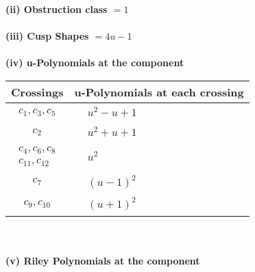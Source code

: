 \documentclass[1p]{elsarticle_modified}
\theoremstyle{definition}
\begin{document}
\flushleft \textbf{(ii) Obstruction class $= 1$}\\~\\
\flushleft \textbf{(iii) Cusp Shapes $= 4 u-1$}\\~\\
\newpage\renewcommand{\arraystretch}{1}
\flushleft \textbf{(iv) u-Polynomials at the component}\newline \\
\begin{tabular}{m{50pt}|m{274pt}}
Crossings & \hspace{64pt}u-Polynomials at each crossing \\
\hline $$\begin{aligned}c_{1},c_{3},c_{5}\end{aligned}$$&$\begin{aligned}
&u^2- u+1
\end{aligned}$\\
\hline $$\begin{aligned}c_{2}\end{aligned}$$&$\begin{aligned}
&u^2+u+1
\end{aligned}$\\
\hline $$\begin{aligned}c_{4},c_{6},c_{8}\\c_{11},c_{12}\end{aligned}$$&$\begin{aligned}
&u^2
\end{aligned}$\\
\hline $$\begin{aligned}c_{7}\end{aligned}$$&$\begin{aligned}
&(u-1)^2
\end{aligned}$\\
\hline $$\begin{aligned}c_{9},c_{10}\end{aligned}$$&$\begin{aligned}
&(u+1)^2
\end{aligned}$\\
\hline
\end{tabular}\\~\\
\newpage\renewcommand{\arraystretch}{1}
\flushleft \textbf{(v) Riley Polynomials at the component}\newline \\
\end{document}
